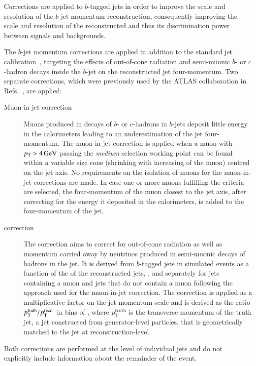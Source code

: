 Corrections are applied to $b$-tagged jets in order to improve the
scale and resolution of the $b$-jet momentum reconstruction,
consequently improving the scale and resolution of the reconstructed
\mBB and thus its discrimination power between signals and
backgrounds.

The $b$-jet momentum corrections are applied in addition to the
standard jet calibration~\cite{JETM-2018-05}, targeting the effects of
out-of-cone radiation and semi-muonic $b$- or $c$-hadron decays inside
the $b$-jet on the reconstructed jet four-momentum. Two separate
corrections, which were previously used by the ATLAS collaboration in
Refs.~\cite{HIGG-2016-29,HIGG-2018-04,HIGG-2018-51}, are applied:
\begin{description}

\item[Muon-in-jet correction] Muons produced in decays of $b$- or
  $c$-hadrons in $b$-jets deposit little energy in the calorimeters
  leading to an underestimation of the jet four-momentum. The
  muon-in-jet correction is applied when a muon with
  $\pT > \SI{4}{\GeV}$ passing the \emph{medium} selection working
  point can be found within a variable size cone (shrinking with
  increasing \pT of the muon) centred on the jet axis. No
  requirements on the isolation of muons for the muon-in-jet
  corrections are made. In case one or more muons fulfilling the
  criteria are selected, the four-momentum of the muon closest to the
  jet axis, after correcting for the energy it deposited in the
  calorimeters, is added to the four-momentum of the jet.

\item[\pTreco correction] The \pTreco correction aims to correct for
  out-of-cone radiation as well as momentum carried away by neutrinos
  produced in semi-muonic decays of hadrons in the jet. It is derived
  from $b$-tagged jets in simulated \ttbar events as a function of the
  \pT of the reconstructed jets, \pTreco, and separately for jets
  containing a muon and jets that do not contain a muon following the
  approach used for the muon-in-jet correction. The correction is
  applied as a multiplicative factor on the jet momentum scale and is
  derived as the ratio $p_{\text{T}}^{\text{truth}} / p_{\text{T}}^{\text{reco.}}$ in bins
  of \pTreco, where $p_{\text{T}}^{\text{truth}}$ is the transverse
  momentum of the truth jet, a jet constructed from generator-level
  particles, that is geometrically matched to the jet at
  reconstruction-level.

\end{description}
Both corrections are performed at the level of individual jets and do
not explicitly include information about the remainder of the event.

